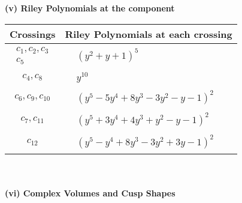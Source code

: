 \documentclass[1p]{elsarticle_modified}
\theoremstyle{definition}
\begin{document}
\newpage\renewcommand{\arraystretch}{1}
\flushleft \textbf{(v) Riley Polynomials at the component}\newline \\
\begin{tabular}{m{50pt}|m{274pt}}
Crossings & \hspace{64pt}Riley Polynomials at each crossing \\
\hline $$\begin{aligned}c_{1},c_{2},c_{3}\\c_{5}\end{aligned}$$&$\begin{aligned}
&(y^2+y+1)^5
\end{aligned}$\\
\hline $$\begin{aligned}c_{4},c_{8}\end{aligned}$$&$\begin{aligned}
&y^{10}
\end{aligned}$\\
\hline $$\begin{aligned}c_{6},c_{9},c_{10}\end{aligned}$$&$\begin{aligned}
&(y^5-5 y^4+8 y^3-3 y^2- y-1)^2
\end{aligned}$\\
\hline $$\begin{aligned}c_{7},c_{11}\end{aligned}$$&$\begin{aligned}
&(y^5+3 y^4+4 y^3+y^2- y-1)^2
\end{aligned}$\\
\hline $$\begin{aligned}c_{12}\end{aligned}$$&$\begin{aligned}
&(y^5- y^4+8 y^3-3 y^2+3 y-1)^2
\end{aligned}$\\
\hline
\end{tabular}\\~\\
\newpage\flushleft \textbf{(vi) Complex Volumes and Cusp Shapes}
\end{document}
